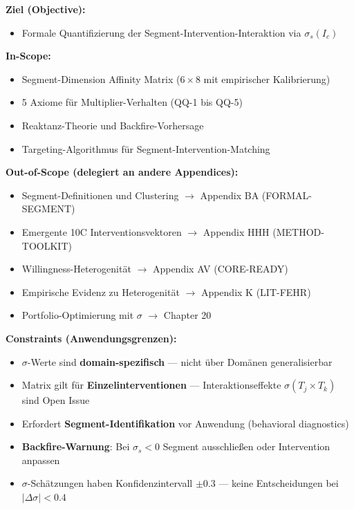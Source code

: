 \begin{tcolorbox}[
    colback=orange!5!white,
    colframe=orange!75!black,
    title={\textbf{Appendix Scope: Ziel / In-Scope / Out-of-Scope / Constraints}},
    fonttitle=\bfseries
]

\textbf{Ziel (Objective):}
\begin{itemize}[nosep]
    \item Formale Quantifizierung der Segment-Intervention-Interaktion via $\sigma_s(I_c)$
\end{itemize}

\textbf{In-Scope:}
\begin{itemize}[nosep]
    \item Segment-Dimension Affinity Matrix ($6 \times 8$ mit empirischer Kalibrierung)
    \item 5 Axiome für Multiplier-Verhalten (QQ-1 bis QQ-5)
    \item Reaktanz-Theorie und Backfire-Vorhersage
    \item Targeting-Algorithmus für Segment-Intervention-Matching
\end{itemize}

\textbf{Out-of-Scope (delegiert an andere Appendices):}
\begin{itemize}[nosep]
    \item Segment-Definitionen und Clustering $\rightarrow$ Appendix BA (FORMAL-SEGMENT)
    \item Emergente 10C Interventionsvektoren $\rightarrow$ Appendix HHH (METHOD-TOOLKIT)
    \item Willingness-Heterogenität $\rightarrow$ Appendix AV (CORE-READY)
    \item Empirische Evidenz zu Heterogenität $\rightarrow$ Appendix K (LIT-FEHR)
    \item Portfolio-Optimierung mit $\sigma$ $\rightarrow$ Chapter 20
\end{itemize}

\textbf{Constraints (Anwendungsgrenzen):}
\begin{itemize}[nosep]
    \item $\sigma$-Werte sind \textbf{domain-spezifisch} --- nicht über Domänen generalisierbar
    \item Matrix gilt für \textbf{Einzelinterventionen} --- Interaktionseffekte $\sigma(T_j \times T_k)$ sind Open Issue
    \item Erfordert \textbf{Segment-Identifikation} vor Anwendung (behavioral diagnostics)
    \item \textbf{Backfire-Warnung}: Bei $\sigma_s < 0$ Segment ausschließen oder Intervention anpassen
    \item $\sigma$-Schätzungen haben Konfidenzintervall $\pm 0.3$ --- keine Entscheidungen bei $|\Delta\sigma| < 0.4$
\end{itemize}


\end{tcolorbox}
